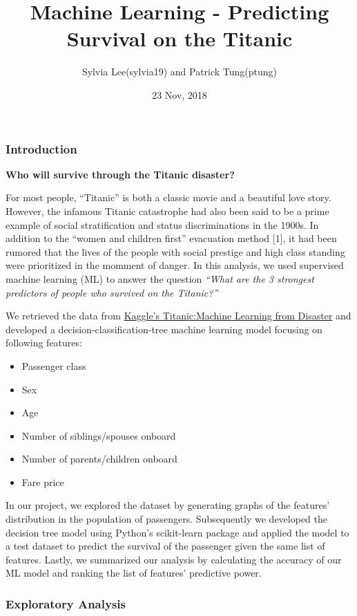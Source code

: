 \documentclass[]{article}
\title{Machine Learning - Predicting Survival on the Titanic}
\author{Sylvia Lee(sylvia19) and Patrick Tung(ptung)}
\date{23 Nov, 2018}
\providecommand{\tightlist}{%
  \setlength{\itemsep}{0pt}\setlength{\parskip}{0pt}}
\begin{document}
\maketitle

\subsubsection{Introduction}\label{introduction}

\textbf{Who will survive through the Titanic disaster?}

For most people, ``Titanic'' is both a classic movie and a beautiful
love story. However, the infamous Titanic catastrophe had also been said
to be a prime example of social stratification and status
discriminations in the 1900s. In addition to the ``women and children
first'' evacuation method {[}1{]}, it had been rumored that the lives of
the people with social prestige and high class standing were prioritized
in the momment of danger. In this analysis, we used supervised machine
learning (ML) to answer the question \emph{``What are the 3 strongest
predictors of people who survived on the Titanic?''}

We retrieved the data from
\href{https://www.kaggle.com/c/titanic}{Kaggle's Titanic:Machine
Learning from Disaster} and developed a decision-classification-tree
machine learning model focusing on following features:

\begin{itemize}
\tightlist
\item
  Passenger class
\item
  Sex
\item
  Age
\item
  Number of siblings/spouses onboard
\item
  Number of parents/children onboard
\item
  Fare price
\end{itemize}

In our project, we explored the dataset by generating graphs of the
features' distribution in the population of passengers. Subsequently we
developed the decision tree model using Python's scikit-learn package
and applied the model to a test dataset to predict the survival of the
passenger given the same list of features. Lastly, we summarized our
analysis by calculating the accuracy of our ML model and ranking the
list of features' predictive power.

\subsubsection{Exploratory Analysis}\label{exploratory-analysis}
\end{document}
